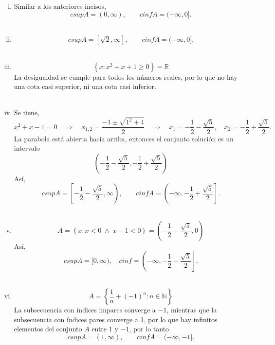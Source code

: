\begin{enumerate}[\bfseries 1.]
\begin{enumerate}[(a)]
\begin{enumerate}[(i)]
		    \item Similar a los anteriores incisos,
			$$csup A = (0,\infty),\qquad cinf A = (-\infty,0].$$\\

		    \item $$csup A = [\sqrt{2},\infty],\qquad cinf A = (-\infty,0].$$\\

		    \item $$\left\{ x: x^2 + x + 1 \geq 0 \right\}=\mathbb{R}$$
			La desigualdad se cumple para todos los números reales, por lo que no hay una cota casi superior, ni una cota casi inferior.\\\\

		    \item Se tiene,
			$$x^2+x-1=0\quad \Rightarrow \quad x_{1,2} = \dfrac{-1\pm \sqrt{1^2+4}}{2} \quad \Rightarrow \quad x_1 = -\dfrac{1}{2}-\dfrac{\sqrt{5}}{2},\quad x_2=-\dfrac{1}{2}+\dfrac{\sqrt{5}}{2}.$$
			La parabola está abierta hacia arriba, entonces el conjunto solución es un intervalo 
			$$\left(-\dfrac{1}{2}-\dfrac{\sqrt{5}}{2}, -\dfrac{1}{2}+\dfrac{\sqrt{5}}{2}\right)$$
			Así,
			$$csup A = \left[-\dfrac{1}{2}-\dfrac{\sqrt{5}}{2},\infty\right),\qquad cinf A = \left(-\infty,-\dfrac{1}{2}+\dfrac{\sqrt{5}}{2}\right].$$\\

		    \item $$A=\left\{x:x<0 \; \land \; x-1<0\right\}=\left(-\dfrac{1}{2}-\dfrac{\sqrt{5}}{2},0\right)$$
			Así,
			$$csup A = [0,\infty), \quad cinf = \left(-\infty,-\dfrac{1}{2}-\dfrac{\sqrt{5}}{2}\right].$$\\

		    \item $$A=\left\{\dfrac{1}{n} + (-1)^n:n\in \mathbb{N}\right\}$$
			La subsecuencia con índices impares converge a $-1$, mientras que la subsecuencia con índices pares converge a 1, por lo que hay infinitos elementos del conjunto $A$ entre $1$ y $-1$, por lo tanto
			$$csup A = (1,\infty),\qquad cinf A  = (-\infty,-1].$$\\

		\end{enumerate}



\end{enumerate}
\end{enumerate}
